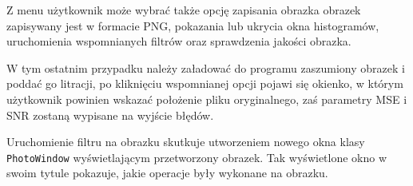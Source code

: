\documentclass{classrep}
\begin{document}
Z menu użytkownik może wybrać także opcję zapisania obrazka \ppauza obrazek zapisywany jest w formacie PNG, pokazania lub ukrycia okna histogramów, uruchomienia wspomnianych filtrów oraz sprawdzenia jakości obrazka.

W tym ostatnim przypadku należy załadować do programu zaszumiony obrazek i poddać go litracji, po kliknięciu wspomnianej opcji pojawi się okienko, w którym użytkownik powinien wskazać położenie pliku oryginalnego, zaś parametry MSE i SNR zostaną wypisane na wyjście błędów.

Uruchomienie filtru na obrazku skutkuje utworzeniem nowego okna klasy \texttt{PhotoWindow} wyświetlającym przetworzony obrazek. Tak wyświetlone okno w swoim tytule pokazuje, jakie operacje były wykonane na obrazku.

\begin{thebibliography}{99}
\end{thebibliography}
\end{document}
